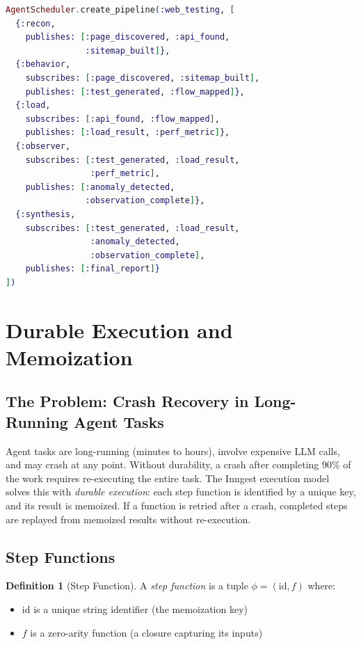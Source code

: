 \documentclass[12pt,a4paper]{article}
\theoremstyle{definition}
\newtheorem{definition}[theorem]{Definition}
\theoremstyle{remark}
\begin{document}
\begin{lstlisting}[language=elixir, caption={Declarative pipeline creation (from \texttt{agent\_scheduler.ex})}, label={lst:create-pipeline}]
AgentScheduler.create_pipeline(:web_testing, [
  {:recon,
    publishes: [:page_discovered, :api_found,
                :sitemap_built]},
  {:behavior,
    subscribes: [:page_discovered, :sitemap_built],
    publishes: [:test_generated, :flow_mapped]},
  {:load,
    subscribes: [:api_found, :flow_mapped],
    publishes: [:load_result, :perf_metric]},
  {:observer,
    subscribes: [:test_generated, :load_result,
                 :perf_metric],
    publishes: [:anomaly_detected,
                :observation_complete]},
  {:synthesis,
    subscribes: [:test_generated, :load_result,
                 :anomaly_detected,
                 :observation_complete],
    publishes: [:final_report]}
])
\end{lstlisting}

\section{Durable Execution and Memoization}\label{sec:durable}

\subsection{The Problem: Crash Recovery in Long-Running Agent Tasks}

Agent tasks are long-running (minutes to hours), involve expensive LLM calls, and may crash at any point. Without durability, a crash after completing 90\% of the work requires re-executing the entire task. The Inngest execution model \citep{inngest2024} solves this with \emph{durable execution}: each step function is identified by a unique key, and its result is memoized. If a function is retried after a crash, completed steps are replayed from memoized results without re-execution.

\subsection{Step Functions}

\begin{definition}[Step Function]\label{def:step-function}
A \emph{step function} is a tuple $\phi = (\text{id}, f)$ where:
\begin{itemize}[leftmargin=2em]
  \item $\text{id}$ is a unique string identifier (the memoization key)
  \item $f$ is a zero-arity function (a closure capturing its inputs)
\end{itemize}
\end{definition}
\end{document}

